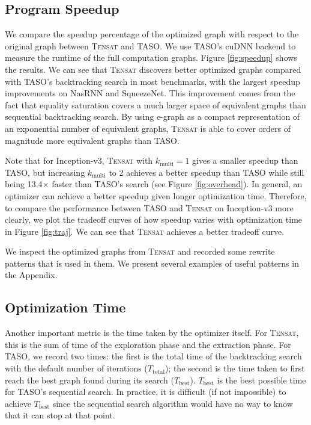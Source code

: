 \documentclass{article}
\newcommand{\ourname}[0]{\textsc{Tensat}}
\begin{document}
\subsection{Program Speedup}
\label{sec:speedup}

We compare the speedup percentage of the optimized graph with respect to the original graph between \ourname{} and TASO. 
We use TASO's cuDNN backend to measure the runtime of the full computation graphs. 
Figure \ref{fig:speedup} shows the results. 
We can see that \ourname{} discovers better optimized graphs compared with TASO's backtracking search in most benchmarks, with the largest speedup improvements on NasRNN and SqueezeNet.
This improvement comes from the fact that equality saturation covers a much larger space of equivalent graphs than sequential backtracking search.
By using e-graph as a compact representation of an exponential number of equivalent graphs, \ourname{} is able to cover orders of magnitude more equivalent graphs than TASO.

Note that for Inception-v3, \ourname{} with $k_{\textrm{multi}}=1$ gives a smaller speedup than TASO, 
but increasing $k_{\textrm{multi}}$ to 2 achieves a better speedup than TASO
while still being 13.4$\times$ faster than TASO's search (see Figure \ref{fig:overhead}).
In general, an optimizer can achieve a better speedup given longer optimization time. 
Therefore, to compare the performance between TASO and \ourname{} on Inception-v3 more clearly, we plot the tradeoff curves of how speedup varies with optimization time in Figure \ref{fig:traj}.
We can see that \ourname{} achieves a better tradeoff curve.

We inspect the optimized graphs from \ourname{} and recorded some rewrite patterns that is used in them.
We present several examples of useful patterns in the Appendix. 

\subsection{Optimization Time}
\label{sec:time}

Another important metric is the time taken by the optimizer itself. 
For \ourname{}, this is the sum of time of the exploration phase and the extraction phase. 
For TASO, we record two times:
the first is the total time of the backtracking search with the default number of iterations ($T_{\textrm{total}}$); 
the second is the time taken to first reach the best graph found during its search ($T_{\textrm{best}}$). 
$T_{\textrm{best}}$ is the best possible time for TASO's sequential search. 
In practice, it is difficult (if not impossible) to achieve $T_{\textrm{best}}$ since the sequential search algorithm would have no way to know that it can stop at that point. 
\end{document}
